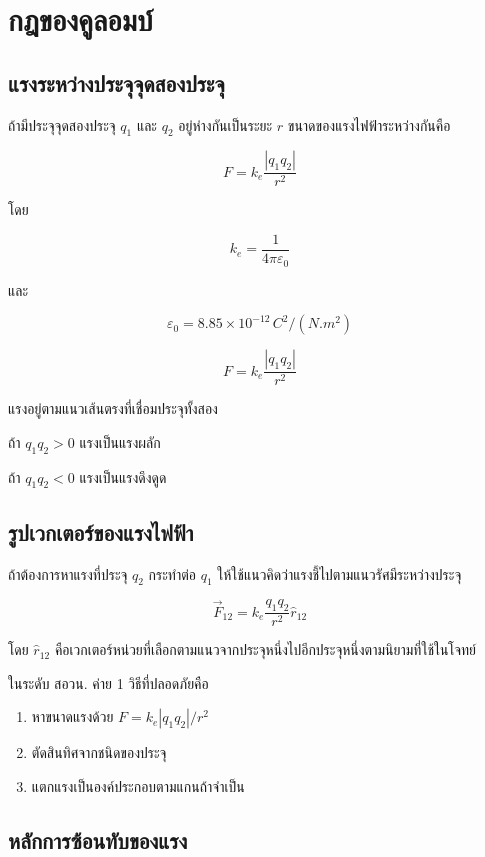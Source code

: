 \section{กฎของคูลอมบ์}

\subsection{แรงระหว่างประจุจุดสองประจุ}

ถ้ามีประจุจุดสองประจุ $q_1$ และ $q_2$ อยู่ห่างกันเป็นระยะ $r$ ขนาดของแรงไฟฟ้าระหว่างกันคือ

\[
F=k_e\frac{|q_1q_2|}{r^2}
\]

โดย

\[
k_e=\frac{1}{4\pi\varepsilon_0}
\]

และ

\[
\varepsilon_0=8.85\times10^{-12}\,\si{C^2/(N.m^2)}
\]

\begin{tcolorbox}[title=กฎของคูลอมบ์]
\[
F=k_e\frac{|q_1q_2|}{r^2}
\]

แรงอยู่ตามแนวเส้นตรงที่เชื่อมประจุทั้งสอง

ถ้า $q_1q_2>0$ แรงเป็นแรงผลัก

ถ้า $q_1q_2<0$ แรงเป็นแรงดึงดูด
\end{tcolorbox}

\subsection{รูปเวกเตอร์ของแรงไฟฟ้า}

ถ้าต้องการหาแรงที่ประจุ $q_2$ กระทำต่อ $q_1$ ให้ใช้แนวคิดว่าแรงชี้ไปตามแนวรัศมีระหว่างประจุ

\[
\vec{F}_{12}=k_e\frac{q_1q_2}{r^2}\hat{r}_{12}
\]

โดย $\hat{r}_{12}$ คือเวกเตอร์หน่วยที่เลือกตามแนวจากประจุหนึ่งไปอีกประจุหนึ่งตามนิยามที่ใช้ในโจทย์

ในระดับ สอวน. ค่าย 1 วิธีที่ปลอดภัยคือ

\begin{enumerate}
    \item หาขนาดแรงด้วย $F=k_e|q_1q_2|/r^2$
    \item ตัดสินทิศจากชนิดของประจุ
    \item แตกแรงเป็นองค์ประกอบตามแกนถ้าจำเป็น
\end{enumerate}

\subsection{หลักการซ้อนทับของแรง}

